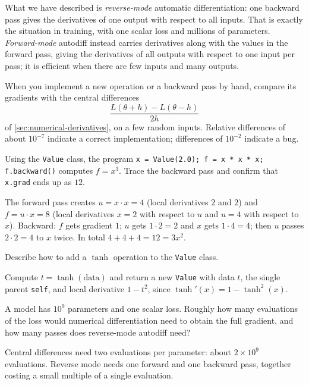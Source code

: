 \begin{remark}
What we have described is \emph{reverse-mode} automatic differentiation: one
backward pass gives the derivatives of one output with respect to all inputs.
That is exactly the situation in training, with one scalar loss and millions of
parameters. \emph{Forward-mode} autodiff instead carries derivatives along with the
values in the forward pass, giving the derivatives of all outputs with respect to
one input per pass; it is efficient when there are few inputs and many outputs.
\end{remark}

\begin{mlnote}
When you implement a new operation or a backward pass by hand, compare its
gradients with the central differences
\[
  \frac{L(\theta + h) - L(\theta - h)}{2h}
\]
of \cref{sec:numerical-derivatives}, on a few random inputs. Relative differences of
about $10^{-7}$ indicate a correct implementation; differences of $10^{-2}$ indicate a
bug.
\end{mlnote}

\sectionexercises

\begin{exercise}
Using the \texttt{Value} class, the program \texttt{x = Value(2.0); f = x * x * x;
f.backward()} computes $f = x^3$. Trace the backward pass and confirm that
\texttt{x.grad} ends up as $12$.
\end{exercise}
\begin{solution}
The forward pass creates $u = x\cdot x = 4$ (local derivatives $2$ and $2$) and
$f = u\cdot x = 8$ (local derivatives $x = 2$ with respect to $u$ and $u = 4$ with
respect to $x$). Backward: $f$ gets gradient $1$; $u$ gets $1\cdot2 = 2$ and $x$ gets
$1\cdot4 = 4$; then $u$ passes $2\cdot2 = 4$ to $x$ twice. In total $4 + 4 + 4 = 12 =
3x^2$.
\end{solution}

\begin{exercise}
Describe how to add a $\tanh$ operation to the \texttt{Value} class.
\end{exercise}
\begin{solution}
Compute $t = \tanh(\text{data})$ and return a new \texttt{Value} with data $t$, the
single parent \texttt{self}, and local derivative $1 - t^2$, since
$\tanh'(x) = 1 - \tanh^2(x)$.
\end{solution}

\begin{exercise}
A model has $10^9$ parameters and one scalar loss. Roughly how many evaluations of
the loss would numerical differentiation need to obtain the full gradient, and how
many passes does reverse-mode autodiff need?
\end{exercise}
\begin{solution}
Central differences need two evaluations per parameter: about $2\times10^9$
evaluations. Reverse mode needs one forward and one backward pass, together
costing a small multiple of a single evaluation.
\end{solution}

